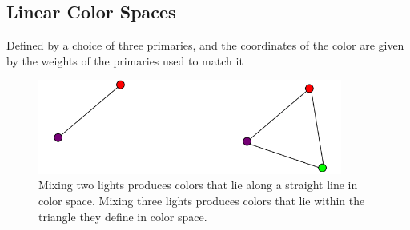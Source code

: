 \documentclass{article}
\begin{document}
\subsection{Linear Color Spaces}
	Defined by a choice of three primaries, and the coordinates of the color are given by the weights of the primaries used to match it
    
    \begin{figure}[h!]
    \centering
    \includegraphics[width=10cm]{color1.png}
    \caption{Mixing two lights produces colors that lie along a straight line in color space. Mixing three lights produces colors that lie within the triangle they define in color space.}
    \end{figure}
    
\end{document}

